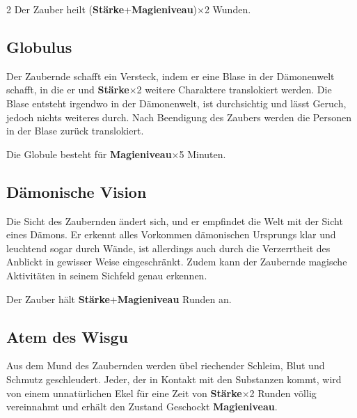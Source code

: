 \begin{multicols*}{2}
Der Zauber heilt (\textbf{Stärke}+\textbf{Magieniveau})×2 Wunden.



\subsection{Globulus}

Der Zaubernde schafft ein Versteck, indem er eine Blase in der Dämonenwelt schafft, in die er und \textbf{Stärke}×2 weitere Charaktere translokiert werden. Die Blase entsteht irgendwo in der Dämonenwelt, ist durchsichtig und lässt Geruch, jedoch nichts weiteres durch. Nach Beendigung des Zaubers werden die Personen in der Blase zurück translokiert.

Die Globule besteht für \textbf{Magieniveau}×5 Minuten.



\subsection{Dämonische Vision}

Die Sicht des Zaubernden ändert sich, und er empfindet die Welt mit der Sicht eines Dämons. Er erkennt alles Vorkommen dämonischen Ursprungs klar und leuchtend sogar durch Wände, ist allerdings auch durch die Verzerrtheit des Anblickt in gewisser Weise eingeschränkt. Zudem kann der Zaubernde magische Aktivitäten in seinem Sichfeld genau erkennen.

Der Zauber hält \textbf{Stärke}+\textbf{Magieniveau} Runden an.



\subsection{Atem des Wisgu}

Aus dem Mund des Zaubernden werden übel riechender Schleim, Blut und Schmutz geschleudert. Jeder, der in Kontakt mit den Substanzen kommt, wird von einem unnatürlichen Ekel für eine Zeit von \textbf{Stärke}×2 Runden völlig vereinnahmt und erhält den Zustand Geschockt \textbf{Magieniveau}.


\end{multicols*}
